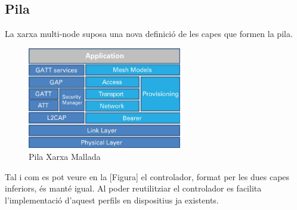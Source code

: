 \subsection{Pila}
La xarxa multi-node suposa una nova definició de les capes que formen la pila.

\begin{figure}[!h]
	\begin{center}
		\includegraphics[width=0.6\textwidth]{./images/mesh_profile_stack.jpg}
		\caption{Pila Xarxa Mallada}
	\end{center}
\end{figure}

Tal i com es pot veure en la [Figura] el controlador, format per les dues capes inferiors, és manté igual.
Al poder reutilitziar el controlador es facilita l'implementació d'aquest perfils en dispositius ja existents.

